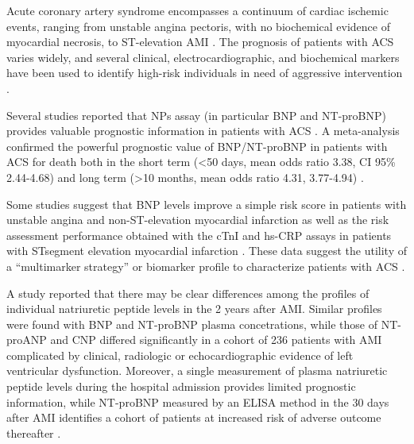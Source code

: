 \documentclass[14pt,a4paper,onecolumn]{extarticle}
\begin{document}
Acute coronary artery syndrome encompasses a continuum of cardiac ischemic events, ranging from unstable angina pectoris, with no biochemical evidence of myocardial necrosis, to ST-elevation AMI \citep{bib3221} \citep{bib3222}. The prognosis of patients with ACS varies widely, and several clinical, electrocardiographic, and biochemical markers have been used to identify high-risk individuals in need of aggressive intervention \citep{bib3222}.



Several studies reported that NPs assay (in particular BNP and NT-proBNP) provides valuable prognostic information in patients with ACS \citep{bib3117} \citep{bib3138} \citep{bib3223} \citep{bib3224} \citep{bib3225} \citep{bib3226} \citep{bib3227} \citep{bib3228} \citep{bib3229} \citep{bib3230} \citep{bib3231}. A meta-analysis confirmed the powerful prognostic value of BNP/NT-proBNP in patients with ACS for death both in the short term (<50 days, mean odds ratio 3.38, CI 95\% 2.44-4.68) and long term (>10 months, mean odds ratio 4.31, 3.77-4.94) \citep{bib376}.




Some studies suggest that BNP levels improve a simple risk score in patients with unstable angina and non-ST-elevation myocardial infarction \citep{bib3239} as well as the risk assessment performance obtained with the cTnI and hs-CRP assays in patients with STsegment elevation myocardial infarction \citep{bib3234}. These data suggest the utility of a “multimarker strategy” or biomarker profile to characterize patients with ACS \citep{bib378}.



A study reported that there may be clear differences among the profiles of individual natriuretic peptide levels in the 2 years after AMI. Similar profiles were found with BNP and NT-proBNP plasma concetrations, while those of NT-proANP and CNP differed significantly in a cohort of 236 patients with AMI complicated by clinical, radiologic or echocardiographic evidence of left ventricular dysfunction. Moreover, a single measurement of plasma natriuretic peptide levels during the hospital admission provides limited prognostic information, while NT-proBNP measured by an ELISA method in the 30 days after AMI identifies a cohort of patients at increased risk of adverse outcome thereafter \citep{bib3240}.
\end{document}
